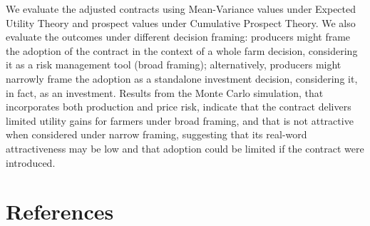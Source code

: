 \documentclass[12pt,a4paper]{article}
\begin{document}
We evaluate the adjusted contracts using Mean-Variance values under Expected Utility Theory and prospect values under Cumulative Prospect Theory. We also evaluate the outcomes under different decision framing: producers might frame the adoption of the contract in the context of a whole farm decision, considering it as a risk management tool (broad framing); alternatively, producers might narrowly frame the adoption as a standalone investment decision, considering it, in fact, as an investment. Results from the Monte Carlo simulation, that incorporates both production and price risk, indicate that the contract delivers limited utility gains for farmers under broad framing, and that is not attractive when considered under narrow framing, suggesting that its real-word attractiveness may be low and that adoption could be limited if the contract were introduced.

\newpage
\section*{References}
\end{document}

